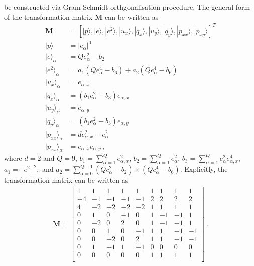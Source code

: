 be constructed via Gram-Schmidt orthgonalisation procedure. The general form of 
the transformation matrix \textbf{M} can be written as
%
\begin{align}
\mathbf{M} & =  
\left[|p\rangle,|e\rangle,|e^2\rangle,|u_x\rangle,|q_x\rangle,|u_y\rangle,
			|q_y\rangle,|p_{xx}\rangle,|p_{xy}\rangle\right]^T \\
|p\rangle & =  |\mathit{e}_{\alpha}|^0\\
|e\rangle_{\alpha} & = \mathit{Q}e_{\alpha}^2-b_2\\
|e^2\rangle_{\alpha} & =  	
		a_1(\mathit{Q}e_{\alpha}^4-b_6)+a_2(\mathit{Q}e_{\alpha}^4-b_6)\\
|u_x\rangle_{\alpha} & = e_{\alpha,x} \\
|q_x\rangle_{\alpha} & = (\mathit{b}_1e_{\alpha}^2-b_3)e_{\alpha,x}\\
|u_y\rangle_{\alpha} & = e_{\alpha,y}\\
|q_y\rangle_{\alpha} & = (\mathit{b}_1e_{\alpha}^2-b_3)e_{\alpha,y}\\
|p_{xx}\rangle_{\alpha} & = \mathit{d}e_{\alpha,x}^2-e_{\alpha}^2\\
|p_{xx}\rangle_{\alpha}  & = e_{\alpha,x}e_{\alpha,y} \,,
\end{align}
%
\noindent where $d = 2$ and $Q = 9$, $b_1=\sum_{\alpha=1}^{Q}e_{\alpha,x}^2$, 
$b_2=\sum_{\alpha=1}^{Q}e_{\alpha}^2$, 
$b_3=\sum_{\alpha=1}^{Q}e_{\alpha}^2e_{\alpha,x}^4$, $a_1=||e^2||^2,$ and 
$a_2=\sum_{\alpha=0}^{Q-1}(Qc_{\alpha}^2-b_2)\times(Qc_{\alpha}^4-b_6)$. 
%
Explicitly, the transformation matrix can be written as
%
\begin{align}
\mathbf{M}= \begin{bmatrix}
 1 &  1 &  1 &  1 &  1 &  1 &  1 &  1 &  1 \\
-4 & -1 & -1 & -1 & -1 &  2 &  2 &  2 &  2 \\ 
 4 & -2 & -2 & -2 & -2 &  1 &  1 &  1 &  1 \\
 0 &  1 &  0 & -1 &  0 &  1 & -1 & -1 &  1 \\
 0 & -2 &  0 &  2 &  0 &  1 & -1 & -1 &  1 \\
 0 &  0 &  1 &  0 & -1 &  1 &  1 & -1 & -1 \\
 0 &  0 & -2 &  0 &  2 &  1 &  1 & -1 & -1 \\
 0 &  1 & -1 &  1 & -1 &  0 &  0 &  0 &  0 \\
 0 &  0 &  0 &  0 &  0 &  1 &  1 &  1 &  1 \\
\end{bmatrix}\,.
\end{align}
